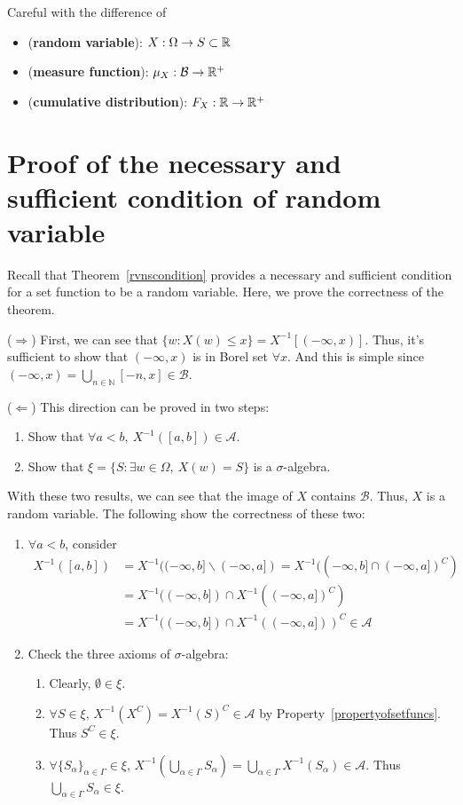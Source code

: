 \documentclass[../Probability_Theory.tex]{subfiles}
\begin{document}
\begin{intuition}
	Careful with the difference of 
	\begin{itemize}
		\item ({\bf random variable}): $X:\Omega\rightarrow S\subset{\mathbb R}$
		\item ({\bf measure function}): $\mu_X:\mathcal{B}\rightarrow{\mathbb R}^+$
		\item ({\bf cumulative distribution}): $F_X:{\mathbb R}\rightarrow{\mathbb R}^+$
	\end{itemize}
\end{intuition}


\section{Proof of the necessary and sufficient condition of random variable}\label{sec:proofrvnscondition}
Recall that Theorem~\ref{rvnscondition} provides a necessary and sufficient condition for a set function to be a random variable. Here, we prove the correctness of the theorem.

($\Rightarrow$) First, we can see that $\{w:X(w)\leq x\} = X^{-1}[(-\infty,x)]$. Thus, it's sufficient to show that $(-\infty,x)$ is in Borel set $\forall x$. And this is simple since $(-\infty,x) = \bigcup_{n\in\mathbb{N}}[-n,x]\in\mathcal{B}$.

($\Leftarrow$) This direction can be proved in two steps:
\begin{enumerate}
	\item Show that $\forall a<b,\ X^{-1}([a,b])\in\mathcal{A}$.
	\item Show that $\xi = \{S:\exists w\in\Omega,\ X(w)=S \}$ is a $\sigma$-algebra.
\end{enumerate}
With these two results, we can see that the image of $X$ contains $\mathcal{B}$. Thus, $X$ is a random variable. The following show the correctness of these two:
\begin{enumerate}
	\item $\forall a<b$, consider
	\begin{align*}
	X^{-1}([a,b]) &= X^{-1}((-\infty,b]\backslash(-\infty,a]) = X^{-1}((-\infty,b]\cap(-\infty,a])^C)\\
	&= X^{-1}((-\infty,b]) \cap X^{-1}((-\infty,a])^C)\\
	&=  X^{-1}((-\infty,b]) \cap X^{-1}((-\infty,a]))^C\in\mathcal{A}
	\end{align*}
	\item Check the three axioms of $\sigma$-algebra:
	\begin{enumerate}
		\item Clearly, $\emptyset\in\xi$.
		\item $\forall S\in\xi$, $X^{-1}(X^C) = X^{-1}(S)^C\in\mathcal{A}$ by Property~\ref{propertyofsetfuncs}. Thus $S^C\in\xi$.
		\item $\forall \{S_{\alpha}\}_{\alpha\in\Gamma}\in\xi$, $X^{-1}(\bigcup_{\alpha\in\Gamma}S_{\alpha}) = \bigcup_{\alpha\in\Gamma}X^{-1}(S_{\alpha})\in\mathcal{A}$. Thus $\bigcup_{\alpha\in\Gamma}S_{\alpha}\in\xi$.
	\end{enumerate}
\end{enumerate}
\end{document}
